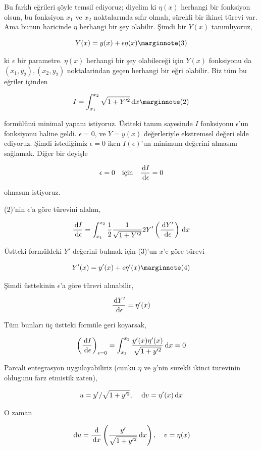 \documentclass[12pt,fleqn]{article}\usepackage{../../common}
\begin{document}
Bu farklı eğrileri şöyle temsil ediyoruz; diyelim ki $\eta(x)$ herhangi bir
fonksiyon olsun, bu fonksiyon $x_1$ ve $x_2$ noktalarında sıfır olmalı,
sürekli bir ikinci türevi var. Ama bunun haricinde $\eta$ herhangi bir şey
olabilir. Şimdi bir $Y(x)$ tanımlıyoruz,

$$
Y(x) = y(x) + \epsilon \eta(x) 
\mlabel{3}
$$

ki $\epsilon$ bir parametre. $\eta(x)$ herhangi bir şey olabileceği için
$Y(x)$ fonksiyonu da $(x_1,y_2),(x_2,y_2)$ noktalarindan geçen herhangi bir
eğri olabilir. Biz tüm bu eğriler içinden

$$
I = \int _{x_1}^{x_2} \sqrt{ 1 + Y'^2} \ud x 
\mlabel{2}
$$

formülünü minimal yapanı istiyoruz. Üstteki tanım sayesinde $I$ fonksiyonu
$\epsilon$'un fonksiyonu haline geldi. $\epsilon = 0$, ve $Y = y(x)$
değerleriyle ekstremsel değeri elde ediyoruz. Şimdi istediğimiz
$\epsilon=0$ iken $I(\epsilon)$'un minimum değerini almasını
sağlamak. Diğer bir deyişle 

$$
\epsilon = 0 \quad \textrm{için} \quad \frac{\,\mathrm{d} I}{\,\mathrm{d} \epsilon} = 0
$$

olmasını istiyoruz.

(2)'nin $\epsilon$'a göre türevini alalım, 

$$
\frac{\,\mathrm{d} I}{\,\mathrm{d} \epsilon} = \int _{x_1}^{x_2} 
\frac{1}{2} \frac{1}{\sqrt{1 + Y'^2}} 2Y' 
\left( \frac{\,\mathrm{d} Y'}{\,\mathrm{d} \epsilon} \right) 
\,\mathrm{d} x
$$

Üstteki formüldeki $Y'$ değerini bulmak için (3)'un $x$'e göre türevi

$$
Y'(x) = y'(x) + \epsilon \eta'(x) 
\mlabel{4}
$$

Şimdi üsttekinin $\epsilon$'a göre türevi alınabilir,

$$
\frac{\,\mathrm{d} Y'}{\,\mathrm{d} \epsilon} = \eta'(x)
$$

Tüm bunları üç üstteki formüle geri koyarsak, 

$$
\left( \frac{\,\mathrm{d} I}{\,\mathrm{d} \epsilon} \right)_{\epsilon = 0} =
\int _{x_1}^{x_2} \frac{ y'(x)\eta'(x) }{\sqrt{1 + y'^2}} \,\mathrm{d} x = 0
$$

Parcali entegrasyon uygulayabiliriz (cunku $\eta$ ve $y$'nin surekli ikinci
turevinin oldugunu farz etmistik zaten),

$$
u = y' / \sqrt{1 + y'^2}, \quad \,\mathrm{d} v = \eta'(x) \,\mathrm{d} x
$$

O zaman 

$$
\,\mathrm{d} u = \frac{\,\mathrm{d}}{\,\mathrm{d} x} \left( \frac{y'}{\sqrt{1+y'^2}} \,\mathrm{d} x \right),
\quad 
v = \eta(x)
$$
\end{document}
